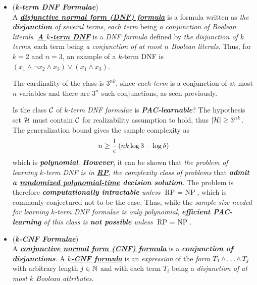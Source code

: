 \documentclass[11pt]{article}
\begin{document}
\begin{itemize}
\item \begin{example}(\emph{\textbf{k-term DNF Formulae}})  \citep{mohri2018foundations}\\
A \underline{\emph{\textbf{disjunctive normal form (DNF) formula}}} is a formula written as \textit{the \textbf{disjunction} of
several terms}, \emph{each term} being \emph{a conjunction of Boolean literals}. \underline{\emph{\textbf{A $k$-term DNF}}} is a \emph{DNF formula} defined by \emph{the disjunction of $k$ terms}, each term being \emph{a conjunction of at most $n$ Boolean literals}. Thus, for $k = 2$ and $n = 3$, an example of a $k$-term DNF is $(x_1 \land \neg x_2 \land x_3) \lor (x_1 \land x_3)$.

The cardinality of the class is $3^{nk}$, since \emph{each term} is a conjunction of at most $n$ variables and there are $3^n$ such conjunctions, as seen previously. 

Is the class ${\mathcal C}$ of \emph{$k$-term DNF formulae} is \emph{\textbf{PAC-learnable}}? The hypothesis set ${\mathcal H}$ must contain ${\mathcal C}$ for realizability assumption to hold, thus $\left\lvert {\mathcal H} \right\rvert \ge 3^{nk}$. The generalization bound gives the sample complexity as 
\begin{align*}
n \ge   \frac{1}{\epsilon}\left(nk \log3 - \log\delta\right) 
\end{align*} which is \emph{\textbf{polynomial}}. \textbf{\emph{However}}, it can be shown that \emph{the problem of learning $k$-term DNF is in \underline{\textbf{RP}}}, \emph{the complexity class of problems} that \emph{\textbf{admit a \underline{randomized polynomial-time} decision solution}}. The problem is therefore \emph{\textbf{computationally intractable} unless $\text{RP }= \text{ NP}$}, which is commonly conjectured not to be the case. Thus,
while the\emph{ sample size needed for learning $k$-term DNF formulae is only polynomial}, \emph{\textbf{efficient PAC-learning} of this class is \textbf{not possible} unless $\text{RP }= \text{ NP}$}.
\end{example}


\item \begin{example}(\emph{\textbf{k-CNF Formulae}})  \citep{mohri2018foundations}\\
A \underline{\emph{\textbf{conjunctive normal form (CNF) formula}}} is a \emph{\textbf{conjunction of disjunctions}}. A \underline{\emph{\textbf{$k$-CNF formula}}} is an \textit{expression} of the \textit{form} $T_1 \,{\land}\ldots{\land}\, T_j$ with arbitrary length $j \in {\mathbb N}$ and with each term $T_i$ being a \emph{disjunction of at most $k$ Boolean attributes}.


\end{example}
\end{itemize}
\end{document}
